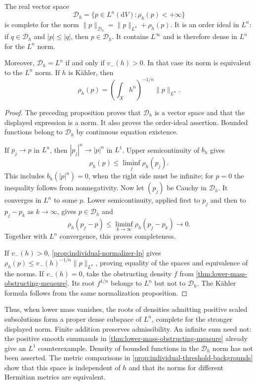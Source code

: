 \begin{proposition}\label{prop:individual-density-banach}
The real vector space
\[
 \mathcal D_h=\{p\in L^n(\mathrm{d}V):\rho_h(p)<+\infty\}
\]
is complete for the norm $\|p\|_{\mathcal D_h}=\|p\|_{L^n}+\rho_h(p)$. It is an order ideal in $L^n$: if $q\in\mathcal D_h$ and $|p|\leq|q|$, then $p\in\mathcal D_h$. It contains $L^\infty$ and is therefore dense in $L^n$ for the $L^n$ norm.

Moreover, $\mathcal D_h=L^n$ if and only if $v_-(h)>0$. In that case its norm is equivalent to the $L^n$ norm. If $h$ is K\"ahler, then
\[
 \rho_h(p)=\left(\int_Xh^n\right)^{-1/n}\|p\|_{L^n}.
\]
\end{proposition}
\begin{proof}
The preceding proposition proves that $\mathcal D_h$ is a vector space and that the displayed expression is a norm. It also proves the order-ideal assertion. Bounded functions belong to $\mathcal D_h$ by continuous equation existence.

If $p_j\to p$ in $L^n$, then $|p_j|^n\to|p|^n$ in $L^1$. Upper semicontinuity of $b_h$ gives
\[
 \rho_h(p)\leq\liminf_j\rho_h(p_j).
\]
This includes $b_h(|p|^n)=0$, when the right side must be infinite; for $p=0$ the inequality follows from nonnegativity. Now let $(p_j)$ be Cauchy in $\mathcal D_h$. It converges in $L^n$ to some $p$. Lower semicontinuity, applied first to $p_j$ and then to $p_j-p_k$ as $k\to\infty$, gives $p\in\mathcal D_h$ and
\[
 \rho_h(p_j-p)\leq\liminf_{k\to\infty}\rho_h(p_j-p_k)\longrightarrow0.
\]
Together with $L^n$ convergence, this proves completeness.

If $v_-(h)>0$, \cref{prop:individual-normalizer-lp} gives
$\rho_h(p)\leq v_-(h)^{-1/n}\|p\|_{L^n}$, proving equality of the spaces and equivalence of the norms. If $v_-(h)=0$, take the obstructing density $f$ from \cref{thm:lower-mass-obstructing-measure}. Its root $f^{1/n}$ belongs to $L^n$ but not to $\mathcal D_h$. The K\"ahler formula follows from the same normalization proposition.
\end{proof}

Thus, when lower mass vanishes, the roots of densities admitting positive scaled subsolutions form a proper dense subspace of $L^n$, complete for the stronger displayed norm. Finite addition preserves admissibility. An infinite sum need not: the positive smooth summands in \cref{thm:lower-mass-obstructing-measure} already give an $L^1$ counterexample. Density of bounded functions in the $\mathcal D_h$ norm has not been asserted. The metric comparisons in \cref{prop:individual-threshold-backgrounds} show that this space is independent of $h$ and that its norms for different Hermitian metrics are equivalent.


